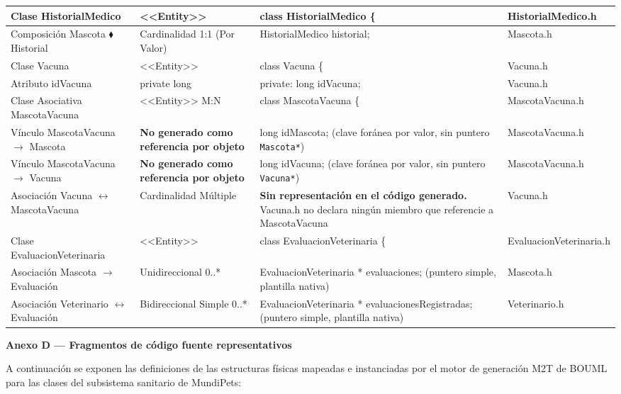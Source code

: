 \documentclass[journal,onecolumn]{IEEEtran}
\begin{document}
\begin{longtable}{|p{3.5cm}|p{3.5cm}|p{4.2cm}|p{3.8cm}|}
		Clase HistorialMedico & <<Entity>> & class HistorialMedico \{ & HistorialMedico.h \\ \hline
		Composición Mascota $\blacklozenge$ Historial & Cardinalidad 1:1 (Por Valor) & HistorialMedico historial; & Mascota.h \\ \hline
		
		Clase Vacuna & <<Entity>> & class Vacuna \{ & Vacuna.h \\ \hline
		Atributo idVacuna & private long & private: long idVacuna; & Vacuna.h \\ \hline
		
		Clase Asociativa MascotaVacuna & <<Entity>> M:N & class MascotaVacuna \{ & MascotaVacuna.h \\ \hline
		Vínculo MascotaVacuna $\to$ Mascota & \textbf{No generado como referencia por objeto} & long idMascota; (clave foránea por valor, sin puntero \texttt{Mascota*}) & MascotaVacuna.h \\ \hline
		Vínculo MascotaVacuna $\to$ Vacuna & \textbf{No generado como referencia por objeto} & long idVacuna; (clave foránea por valor, sin puntero \texttt{Vacuna*}) & MascotaVacuna.h \\ \hline
		Asociación Vacuna $\leftrightarrow$ MascotaVacuna & Cardinalidad Múltiple & \textbf{Sin representación en el código generado.} Vacuna.h no declara ningún miembro que referencie a MascotaVacuna & Vacuna.h \\ \hline
		
		Clase EvaluacionVeterinaria & <<Entity>> & class EvaluacionVeterinaria \{ & EvaluacionVeterinaria.h \\ \hline
		Asociación Mascota $\to$ Evaluación & Unidireccional 0..* & EvaluacionVeterinaria * evaluaciones; (puntero simple, plantilla nativa) & Mascota.h \\ \hline
		Asociación Veterinario $\leftrightarrow$ Evaluación & Bidireccional Simple 0..* & EvaluacionVeterinaria * evaluacionesRegistradas; (puntero simple, plantilla nativa) & Veterinario.h \\ \hline
	\end{longtable}
	
	\newpage
	\textbf{Anexo D --- Fragmentos de código fuente representativos}
	\label{anexo:codigo_generado}
	
	A continuación se exponen las definiciones de las estructuras físicas mapeadas e instanciadas por el motor de generación M2T de BOUML para las clases del subsistema sanitario de MundiPets:
	
\end{document}
